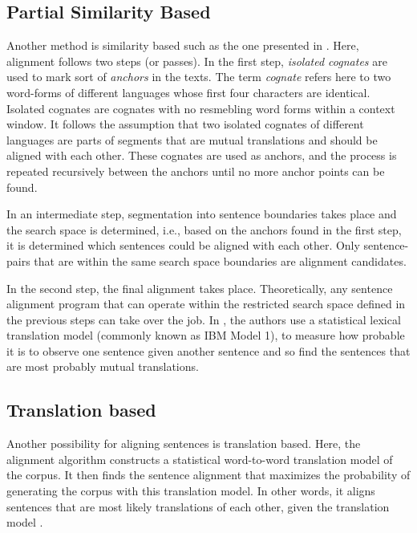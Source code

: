 \subsection{Partial Similarity Based}
Another method is similarity based such as the one presented in \cite{simard-plamondon-1996-bilingual}. 
Here, alignment follows two steps (or passes). 
In the first step, \emph{isolated cognates} are used to mark sort of \emph{anchors} in the texts. 
The term \emph{cognate} refers here to two word-forms of different languages whose  first four characters are identical. 
Isolated cognates are cognates with no resmebling word forms within a context window.
It follows the assumption that two isolated cognates of different languages are parts of segments that are mutual translations and should be aligned with each other. 
These cognates are used as anchors, and the process is repeated recursively between the anchors until no more anchor points can be found.

In an intermediate step, segmentation into sentence boundaries takes place and the search space is determined, i.e., based on the anchors found in the first step, it is determined which sentences could be aligned with each other. 
Only sentence-pairs that are within the same search space boundaries are alignment candidates.

In the second step, the final alignment takes place. 
Theoretically, any sentence alignment program that can operate within the restricted search space defined in the previous steps can take over the job. 
In \cite{simard-plamondon-1996-bilingual}, the authors use a statistical lexical translation model (commonly known as IBM Model 1), to measure how probable it is to observe one sentence given another sentence and so find the sentences that are most probably mutual translations.

\subsection{Translation based}

Another possibility for aligning sentences is translation based. 
Here, the alignment algorithm constructs a statistical word-to-word translation model of the corpus. 
It then finds the sentence alignment that maximizes the probability of generating the corpus with this translation model. 
In other words, it aligns sentences that are most likely translations of each other, given the translation model \autocite{chen-1993-aligning}. 

